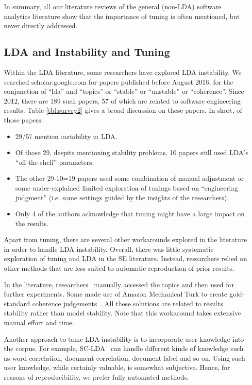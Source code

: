 \documentclass[twocolumn,5p,sort&compress]{elsarticle}
\newcommand{\bi}{\begin{itemize}}
\newcommand{\ei}{\end{itemize}}
\theoremstyle{break}
\begin{document}
In summary, all our literature reviews of the general  (non-LDA) software analytics literature
show that
the importance of tuning is often mentioned, but never directly addressed.

\subsection{LDA and  Instability and Tuning}
\label{sect:solutions}
Within the LDA literature, some researchers
have explored LDA instability.
We searched scholar.google.com for papers published before August 2016, for the conjunction of ``lda'' and ``topics'' or ``stable'' or
``unstable'' or ``coherence''. Since 2012, there are  189 such papers, 57
of which are related to software engineering results. Table \ref{tbl:survey2} gives a broad discussion on these papers. In short, of those papers:
\bi
\item 29/57
mention instability in LDA. %
\item Of those 29, despite mentioning stability problems,
  10 papers still used LDA's ``off-the-shelf'' parameters;
  \item The  other 29-10=19 papers used some combination of manual adjustment or some
under-explained limited exploration of tunings based on ``engineering judgment''
(i.e. some settings guided by the insights of the researchers).
\item
Only 4 of the authors acknowledge that tuning might have a large impact
on the results.
\ei
Apart from tuning, there are several other workarounds explored in the literature
in order to handle LDA instability. Overall, there was little systematic exploration of tuning and LDA in the SE literature.
Instead, researchers relied on other methods that are less suited to automatic reproduction of prior results.

In the literature, researchers~\cite{maskeri2008mining, martin2015app, guzman2014users}
    manually accessed the topics and then used for further experiments. Some
    made use of Amazon Mechanical Turk to create gold-standard coherence
    judgements~\cite{lau2014machine}. All these solutions are related to results
    stability rather than model stability.
    Note that this workaround takes extensive manual effort and time.

    
    Another approach to tame LDA instability
    is to incorporate
    user knowledge into the corpus. For example,
    SC-LDA~\cite{yang2015improving} can
    handle different kinds of knowledge such as word correlation,
    document correlation, document label and so on. Using such user
    knowledge, while certainly valuable, is somewhat subjective.
    Hence, for reasons of reproducibility, we prefer fully
    automated methods.
\end{document}
